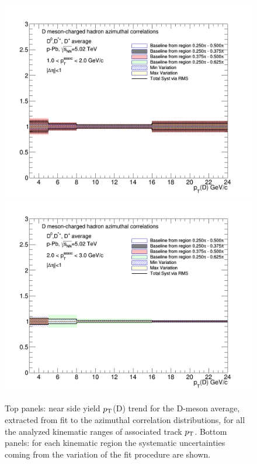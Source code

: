 \begin{figure}[!htbp]
{\includegraphics[width=0.49\linewidth, height=0.33\linewidth]{figures/FitOutput/BaselineSystematicSourcesNSYield_pthad1dotto2dot.png}}
{\includegraphics[width=0.49\linewidth, height=0.33\linewidth]{figures/FitOutput/BaselineSystematicSourcesNSYield_pthad2dotto3dot.png}}
\caption{Top panels: near side yield $p_{\rm T}$(D) trend for the D-meson average, extracted from fit to the azimuthal correlation distributions, for all the analyzed kinematic ranges of associated track $p_{\rm T}$. Bottom panels: for each kinematic region the systematic uncertainties coming from the variation of the fit procedure are shown.}
\label{fig:nearsideyieldAverage}
\end{figure}

